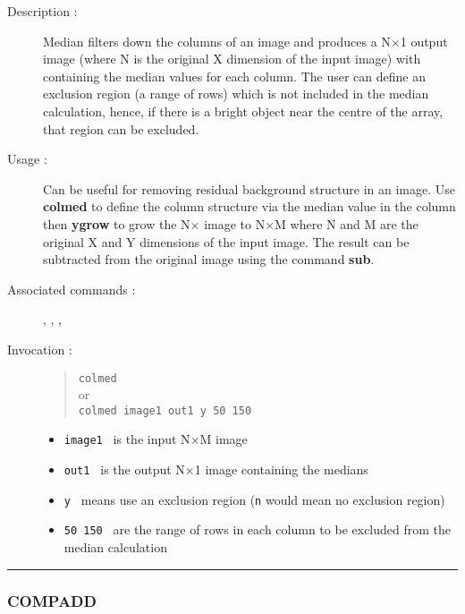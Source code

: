 \begin{description}

\item[Description :] Median filters down the columns of an image
and produces a N$\times$1 output image (where N is the original X
dimension of the input image) with containing the median values for
each column.  The user can define an exclusion region (a range of rows)
which is not included in the median calculation, hence, if there is a
bright object near the centre of the array, that region can be
excluded.

\item[Usage :] Can be useful for removing residual background structure in an
image.  Use {\bf colmed} to define the column structure via the median value
in the column then {\bf ygrow} to grow the N$\times$ image to N$\times$M
where N and M are the original X and Y dimensions of the input image.
The result can be subtracted from the original image using the command
{\bf sub}.

\item[Associated commands :] {\tt {}}, 
{\tt {}}, {\tt {}}, 
{\tt {}}

\item[Invocation :]

\begin{quote}{\tt  colmed} \\
or \\
{\tt colmed image1 out1 y 50 150 }
\end{quote}

\begin{itemize}

\item {\tt image1 } is the input N$\times$M image
\item {\tt out1 } is the output N$\times$1 image containing the medians
\item {\tt y } means use an exclusion region ({\tt n} would mean no exclusion
 region)
\item {\tt 50 150 } are the range of rows in each column to be excluded
 from the median calculation
\end{itemize}

\end{description}

\hrule 
\subsubsection*{\label{COMPADD}COMPADD}

